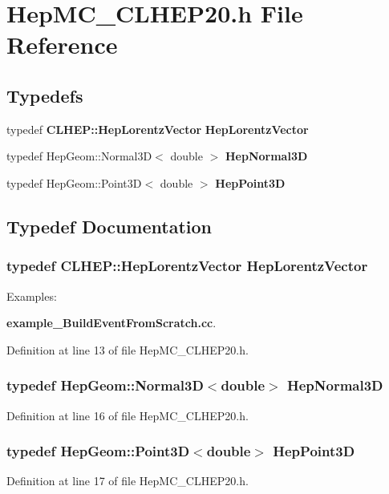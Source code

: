 \section{Hep\-MC\_\-CLHEP20.h File Reference}
\label{HepMC__CLHEP20_8h}
\subsection*{Typedefs}
\begin{CompactItemize}
\item 
typedef {\bf CLHEP::Hep\-Lorentz\-Vector} {\bf Hep\-Lorentz\-Vector}
\item 
typedef Hep\-Geom::Normal3D$<$ double $>$ {\bf Hep\-Normal3D}
\item 
typedef Hep\-Geom::Point3D$<$ double $>$ {\bf Hep\-Point3D}
\end{CompactItemize}


\subsection{Typedef Documentation}
\subsubsection{\setlength{\rightskip}{0pt plus 5cm}typedef {\bf CLHEP::Hep\-Lorentz\-Vector} {\bf Hep\-Lorentz\-Vector}}\label{HepMC__CLHEP20_8h_970ee4c19c17d32221210d59c944ceea}


\begin{Desc}
\item[Examples: ]\par
{\bf example\_\-Build\-Event\-From\-Scratch.cc}.\end{Desc}


Definition at line 13 of file Hep\-MC\_\-CLHEP20.h.
\subsubsection{\setlength{\rightskip}{0pt plus 5cm}typedef Hep\-Geom::Normal3D$<$double$>$ {\bf Hep\-Normal3D}}\label{HepMC__CLHEP20_8h_b27331a0fa4cb22dc33701e6a88f83fa}




Definition at line 16 of file Hep\-MC\_\-CLHEP20.h.
\subsubsection{\setlength{\rightskip}{0pt plus 5cm}typedef Hep\-Geom::Point3D$<$double$>$ {\bf Hep\-Point3D}}\label{HepMC__CLHEP20_8h_188faf2fae63125a32fe38f0567026bc}




Definition at line 17 of file Hep\-MC\_\-CLHEP20.h.